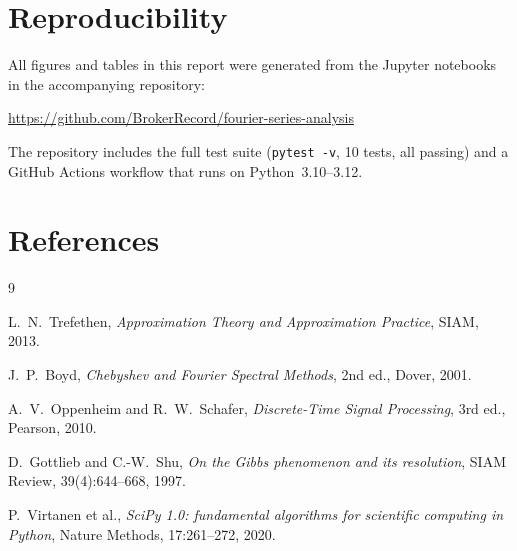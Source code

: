 \documentclass[11pt,a4paper]{article}
\begin{document}
\section*{Reproducibility}

All figures and tables in this report were generated from the Jupyter
notebooks in the accompanying repository:
\begin{center}
\url{https://github.com/BrokerRecord/fourier-series-analysis}
\end{center}
The repository includes the full test suite
(\texttt{pytest -v}, 10 tests, all passing) and a GitHub Actions workflow
that runs on Python~3.10--3.12.

\section*{References}
\begin{thebibliography}{9}

L.~N.~Trefethen,
\emph{Approximation Theory and Approximation Practice},
SIAM, 2013.

J.~P.~Boyd,
\emph{Chebyshev and Fourier Spectral Methods},
2nd ed., Dover, 2001.

A.~V.~Oppenheim and R.~W.~Schafer,
\emph{Discrete-Time Signal Processing},
3rd ed., Pearson, 2010.

D.~Gottlieb and C.-W.~Shu,
\emph{On the Gibbs phenomenon and its resolution},
SIAM Review, 39(4):644--668, 1997.

P.~Virtanen et al.,
\emph{SciPy 1.0: fundamental algorithms for scientific computing in Python},
Nature Methods, 17:261--272, 2020.

\end{thebibliography}
\end{document}
